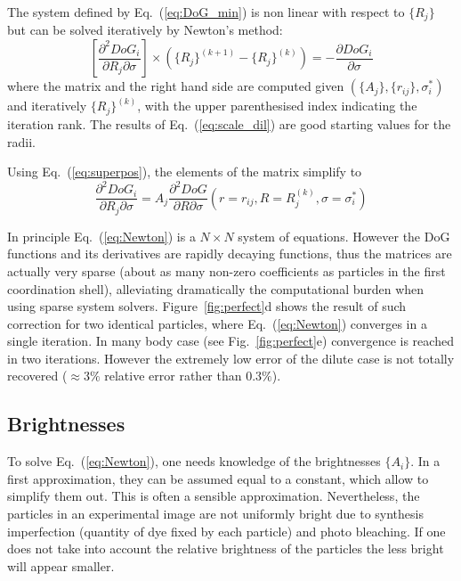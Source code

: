 \documentclass[8.5pt,twoside,twocolumn]{article}
\begin{document}
The system defined by Eq.~(\ref{eq:DoG_min}) is non linear with respect to $\lbrace R_j\rbrace$ but can be solved iteratively by Newton's method:
\begin{equation}
\left[ \frac{\partial^2 DoG_i}{\partial R_j\partial\sigma}\right] \times \left( \lbrace R_j\rbrace^{(k+1)} - \lbrace R_j\rbrace^{(k)} \right) = -\frac{\partial DoG_i}{\partial\sigma}
\label{eq:Newton}
\end{equation}
where the matrix and the right hand side are computed given $(\lbrace A_j\rbrace, \lbrace r_{ij}\rbrace, \sigma_i^*)$ and iteratively $\lbrace R_j\rbrace^{(k)}$, with the upper parenthesised index indicating the iteration rank. The results of Eq.~(\ref{eq:scale_dil}) are good starting values for the radii.

Using Eq.~(\ref{eq:superpos}), the elements of the matrix simplify to
\begin{equation}
\frac{\partial^2 DoG_i}{\partial R_j\partial\sigma} =  A_j \frac{\partial^2 DoG}{\partial R\partial\sigma}(r=r_{ij}, R=R_j^{(k)}, \sigma=\sigma_i^*)
\end{equation}

In principle Eq.~(\ref{eq:Newton}) is a $N\times N$ system of equations. However the DoG functions and its derivatives are rapidly decaying functions, thus the matrices are actually very sparse (about as many non-zero coefficients as particles in the first coordination shell), alleviating dramatically the computational burden when using sparse system solvers. Figure~\ref{fig:perfect}d shows the result of such correction for two identical particles, where Eq.~(\ref{eq:Newton}) converges in a single iteration. In many body case (see Fig.~\ref{fig:perfect}e) convergence is reached in two iterations. However the extremely low error of the dilute case is not totally recovered ($\approx 3\%$ relative error rather than $0.3\%$).

\subsection{Brightnesses}

To solve Eq.~(\ref{eq:Newton}), one needs knowledge of the brightnesses $\lbrace A_i\rbrace$. In a first approximation, they can be assumed equal to a constant, which allow to simplify them out. This is often a sensible approximation. Nevertheless, the particles in an experimental image are not uniformly bright due to synthesis imperfection (quantity of dye fixed by each particle) and photo bleaching. If one does not take into account the relative brightness of the particles the less bright will appear smaller.
\end{document}
